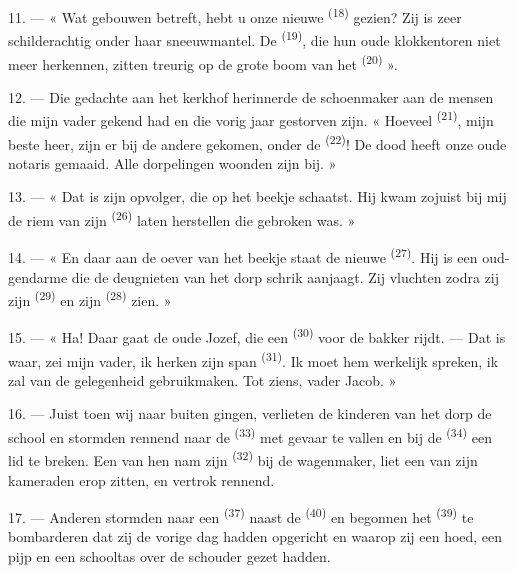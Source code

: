 11. --- « Wat gebouwen betreft, hebt u onze nieuwe  \textsuperscript{(18)}
gezien? Zij is zeer schilderachtig onder haar sneeuwmantel. De 
\textsuperscript{(19)}, die hun oude klokkentoren niet meer herkennen, zitten treurig op de
grote boom van het
 \textsuperscript{(20)} ».

12. --- Die gedachte aan het kerkhof herinnerde de schoenmaker aan de mensen die mijn vader
gekend had en die vorig jaar gestorven zijn. « Hoeveel  \textsuperscript{(21)},
mijn beste heer, zijn er bij de andere gekomen, onder de
 \textsuperscript{(22)}! De dood heeft onze oude notaris gemaaid.
Alle dorpelingen woonden zijn  bij. »

13. --- « Dat is zijn opvolger, die op het beekje schaatst. Hij kwam zojuist bij mij de riem
van zijn  \textsuperscript{(26)} laten herstellen die gebroken was. »

14. --- « En daar aan de oever van het beekje staat de nieuwe
 \textsuperscript{(27)}. Hij is een oud-gendarme die de
deugnieten van het dorp schrik aanjaagt. Zij vluchten zodra zij zijn
 \textsuperscript{(29)} en zijn 
\textsuperscript{(28)} zien. »

15. --- « Ha! Daar gaat de oude Jozef, die een 
\textsuperscript{(30)} voor de bakker rijdt. --- Dat is waar, zei mijn vader, ik herken zijn
span  \textsuperscript{(31)}. Ik moet hem werkelijk spreken, ik zal van de
gelegenheid gebruikmaken. Tot ziens, vader Jacob. »

16. --- Juist toen wij naar buiten gingen, verlieten de kinderen van het dorp de school en
stormden rennend naar de  \textsuperscript{(33)} met gevaar te vallen en bij
de  \textsuperscript{(34)} een lid te breken. Een van hen nam zijn 
\textsuperscript{(32)} bij de wagenmaker, liet een van zijn kameraden erop zitten, en vertrok
rennend.

17. --- Anderen stormden naar een  \textsuperscript{(37)} naast de
 \textsuperscript{(40)} en begonnen het
 \textsuperscript{(39)} te bombarderen dat zij de vorige dag
hadden opgericht en waarop zij een hoed, een pijp en een schooltas over de schouder gezet
hadden.

